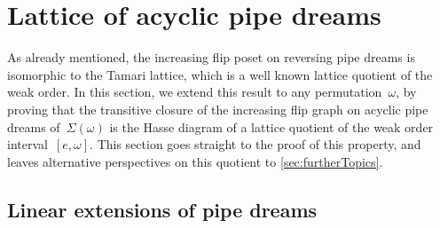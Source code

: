 \documentclass{amsart}
\newtheorem{lemma}[theorem]{Lemma}
\theoremstyle{definition}
\newcommand{\vincent}[1]{\todo[color=blue!30]{#1 \\ \hfill --- V.}}
\newcommand{\contact}{^\#} %
\newcommand{\acyclicPipeDreams}{\Sigma} %
\newcommand{\less}{\vartriangleleft} %
\newcommand{\more}{\vartriangleright} %
\newcommand{\contactLess}[1]{\less_{#1}} %
\newcommand{\contactMore}[1]{\more_{#1}} %
\begin{document}
%




\section{Lattice of acyclic pipe dreams}
\label{sec:latticeAcyclicPipeDreams}

As already mentioned, the increasing flip poset on reversing pipe dreams is isomorphic to the Tamari lattice, which is a well known lattice quotient of the weak order.
In this section, we extend this result to any permutation~$\omega$, by proving that the transitive closure of the increasing flip graph on acyclic pipe dreams of~$\acyclicPipeDreams(\omega)$ is the Hasse diagram of a lattice quotient of the weak order interval~$[e,\omega]$.
This section goes straight to the proof of this property, and leaves alternative perspectives on this quotient to \cref{sec:furtherTopics}.


\subsection{Linear extensions of pipe dreams}
\label{subsec:linearExtensions}
\end{document}

